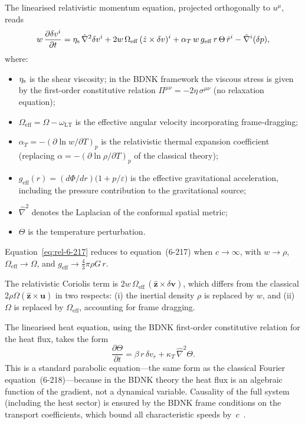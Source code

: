 The linearised relativistic momentum equation, projected
orthogonally to $u^{\mu}$, reads
\begin{equation}\label{eq:rel-6-217}
  w\,\frac{\partial\delta v^{i}}{\partial t}
  = \eta_{\mathrm{s}}\,\hat{\nabla}^{2}\delta v^{i}
    + 2w\,\Omega_{\mathrm{eff}}\,
      (\hat{z}\times\delta v)^{i}
    + \alpha_{T}\,w\,g_{\mathrm{eff}}\,r\,\Theta\,\hat{r}^{i}
    - \hat{\nabla}^{i}(\delta p),
\end{equation}
where:
\begin{itemize}
\item $\eta_{\mathrm{s}}$ is the shear viscosity; in the BDNK framework the
  viscous stress is given by the first-order constitutive relation
  $\Pi^{\mu\nu} = -2\eta\,\sigma^{\mu\nu}$ (no relaxation equation);
\item $\Omega_{\mathrm{eff}} = \Omega - \omega_{\mathrm{LT}}$ is the
  effective angular velocity incorporating frame-dragging;
\item $\alpha_{T} = -(\partial\ln w/\partial T)_{p}$ is the
  relativistic thermal expansion coefficient (replacing
  $\alpha = -(\partial\ln\rho/\partial T)_p$ of the classical theory);
\item $g_{\mathrm{eff}}(r) = (d\Phi/dr)\bigl(1 + p/\varepsilon\bigr)$
  is the effective gravitational acceleration, including the
  pressure contribution to the gravitational source;
\item $\hat{\nabla}^{2}$ denotes the Laplacian of the conformal
  spatial metric;
\item $\Theta$ is the temperature perturbation.
\end{itemize}
Equation~\eqref{eq:rel-6-217} reduces to equation~(6-217) when
$c\to\infty$, with $w\to\rho$, $\Omega_{\mathrm{eff}}\to\Omega$,
and $g_{\mathrm{eff}}\to\tfrac{4}{3}\pi\rho G\,r$.

The relativistic Coriolis term is
$2w\,\Omega_{\mathrm{eff}}\,(\hat{\boldsymbol{z}}\times\delta\boldsymbol{v})$,
which differs from the classical $2\rho\Omega(\hat{\boldsymbol{z}}\times\boldsymbol{u})$
in two respects: (i) the inertial density $\rho$ is replaced by $w$,
and (ii) $\Omega$ is replaced by $\Omega_{\mathrm{eff}}$, accounting
for frame dragging.

The linearised heat equation, using the BDNK first-order constitutive
relation for the heat flux, takes the form
\begin{equation}\label{eq:rel-6-218}
  \frac{\partial\Theta}{\partial t}
  = \beta\,r\,\delta v_{r}
    + \kappa_{T}\,\hat{\nabla}^{2}\Theta.
\end{equation}
This is a standard parabolic equation---the same form as the
classical Fourier equation~(6-218)---because in the BDNK theory
the heat flux is an algebraic function of the gradient, not a
dynamical variable.  Causality of the full system (including the
heat sector) is ensured by the BDNK frame conditions on the
transport coefficients, which bound all characteristic speeds
by~$c$~\cite{BemficaDN2018,Kovtun2019,BemficaDNK2023}.

